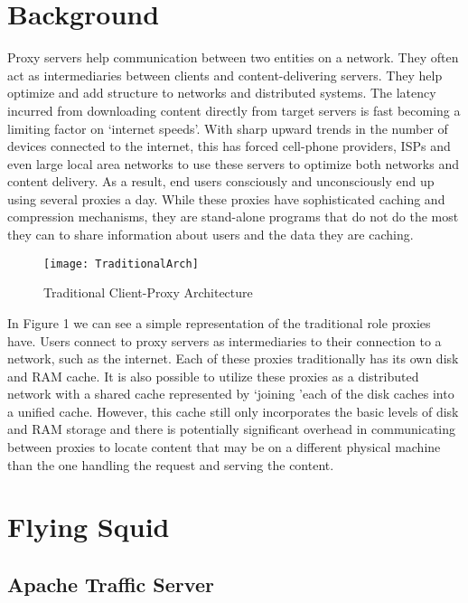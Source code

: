 

\section{Background}

Proxy servers help communication between two entities on a network. They often act as intermediaries between clients and content-delivering servers. They help optimize and add structure to networks and distributed systems. The latency incurred from downloading content directly from target servers is fast becoming a limiting factor on ‘internet speeds’. With sharp upward trends in the number of devices connected to the internet, this has forced cell-phone providers, ISPs and even large local area networks to use these servers to optimize both networks and content delivery. As a result, end users consciously and unconsciously end up using several proxies a day. While these proxies have sophisticated caching and compression mechanisms, they are stand-alone programs that do not do the most they can to share information about users and the data they are caching.

\begin{figure}[H] \centering
\texttt{[image: TraditionalArch]}
\caption{Traditional Client-Proxy Architecture}
\end{figure}


In Figure 1 we can see a simple representation of the traditional role proxies have. Users connect to proxy servers as intermediaries to their connection to a network, such as the internet. Each of these proxies traditionally has its own disk and RAM cache. It is also possible to utilize these proxies as a distributed network with a shared cache represented by \lq joining \rq each of the disk caches into a unified cache. However, this cache still only incorporates the basic levels of disk and RAM storage and there is potentially significant overhead in communicating between proxies to locate content that may be on a different physical machine than the one handling the request and serving the content.



\section{Flying Squid}

\subsection{Apache Traffic Server}

